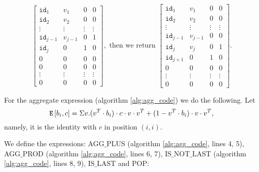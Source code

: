 \[
\begin{bmatrix}
    \texttt{id}_1 & v_1 & 0 & 0 \\
    \texttt{id}_2 & v_2 & 0 & 0 \\
    \vdots & \vdots & \vdots & \vdots \\
    \texttt{id}_{j-1} & v_{j-1} & 0 & 1 \\
    \texttt{id}_j & 0 & 1 & 0 \\
    0 & 0 & 0 & 0 \\
    0 & 0 & 0 & 0 \\
    \vdots & \vdots & \vdots & \vdots \\
     0 & 0 & 0 & 0
\end{bmatrix}, \text{ then we return }
\begin{bmatrix}
    \texttt{id}_1 & v_1 & 0 & 0 \\
    \texttt{id}_2 & v_2 & 0 & 0 \\
    \vdots & \vdots & \vdots & \vdots \\
    \texttt{id}_{j-1} & v_{j-1} & 0 & 0 \\
    \texttt{id}_j & v_j & 0 & 1 \\
    \texttt{id}_{j+1} & 0 & 1 & 0 \\
    0 & 0 & 0 & 0 \\
    \vdots & \vdots & \vdots & \vdots \\
     0 & 0 & 0 & 0
\end{bmatrix}.
\]


For the aggregate expression (algorithm \ref{alg:agg_code}) we do the following. Let $$\texttt{E}\left[ b_i, c \right]=\Sigma v. (v^T\cdot b_i)\cdot c\cdot v\cdot v^T + (1-v^T\cdot b_i)\cdot v \cdot v^T,$$ namely, it is the identity with $c$ in position $(i,i)$.

We define the expressions: AGG${\_}$PLUS (algorithm \ref{alg:agg_code}, lines 4, 5), AGG${\_}$PROD (algorithm \ref{alg:agg_code}, lines 6, 7),  IS${\_}$NOT${\_}$LAST (algorithm \ref{alg:agg_code}, lines 8, 9), IS${\_}$LAST and POP:

